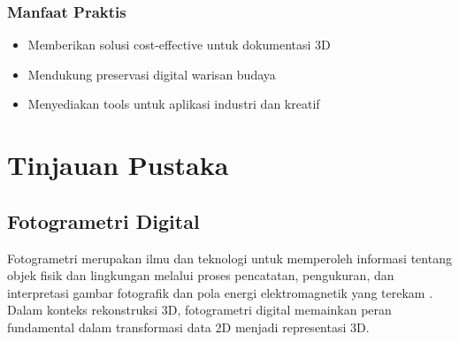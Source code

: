 \documentclass[12pt,a4paper]{article}
\begin{document}
\subsubsection{Manfaat Praktis}
\begin{itemize}
    \item Memberikan solusi cost-effective untuk dokumentasi 3D
    \item Mendukung preservasi digital warisan budaya
    \item Menyediakan tools untuk aplikasi industri dan kreatif
\end{itemize}




\clearpage

\section{Tinjauan Pustaka}

\subsection{Fotogrametri Digital}

Fotogrametri merupakan ilmu dan teknologi untuk memperoleh informasi tentang objek fisik dan lingkungan melalui proses pencatatan, pengukuran, dan interpretasi gambar fotografik dan pola energi elektromagnetik yang terekam \cite{ref1}. Dalam konteks rekonstruksi 3D, fotogrametri digital memainkan peran fundamental dalam transformasi data 2D menjadi representasi 3D.
\end{document}
